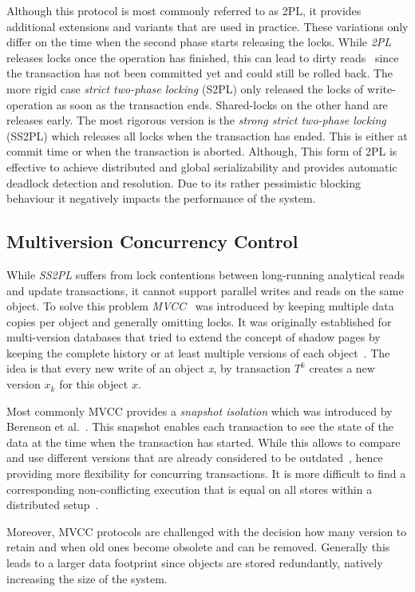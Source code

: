 Although this protocol is most commonly referred to as 2PL, it provides additional extensions and variants that are used in practice. 
These variations only differ on the time when the second phase starts releasing the locks. 
While \emph{2PL} releases locks once the operation has finished, this can lead to dirty 
reads~\cite{weikum:2001} since the transaction has not been committed yet and could still be rolled back.
The more rigid case \emph{strict two-phase locking} (S2PL) only released the locks of write-operation as soon as the transaction ends.
Shared-locks on the other hand are releases early.
The most rigorous version is the \emph{strong strict two-phase locking} (SS2PL) which releases all locks when the transaction has ended.
This is either at commit time or when the transaction is aborted.
Although, This form of 2PL is effective to achieve distributed and global serializability and provides automatic deadlock detection and resolution.
Due to its rather pessimistic blocking behaviour it negatively impacts the performance of the system.



\subsection{Multiversion Concurrency Control}
While \emph{SS2PL} suffers from lock contentions between long-running analytical reads and update transactions, it cannot support parallel writes and reads on the same object. 
To solve this problem \emph{MVCC}~\cite{bernstein:1981} was introduced by keeping multiple data copies per object and generally omitting locks.
It was originally established for multi-version databases that tried to extend the concept of shadow pages by keeping the complete history or at least multiple versions 
of each object~\cite{bernstein:1982, bernstein:1983}.
The idea is that every new write of an object \emph{x}, by transaction $T^k$ creates a new version $x_k$ for this object $x$.

Most commonly MVCC provides a \emph{snapshot isolation} which was introduced by Berenson et al.~\cite{berenson:1995}.
This snapshot enables each transaction to see the state of the data at the time when the transaction has started.
While this allows to compare and use different versions that are already considered to be outdated~\cite{faleiro:2015}, 
hence providing more flexibility for concurring transactions. It is more difficult to find a corresponding non-conflicting 
execution that is equal on all stores within a distributed setup~\cite{fekete:2005, daudjee:2006}.

Moreover, MVCC protocols are challenged with the decision how many version to retain and when old ones become obsolete and can be removed. 
Generally this leads to a larger data footprint since objects are stored redundantly, natively increasing the size of the system. 

